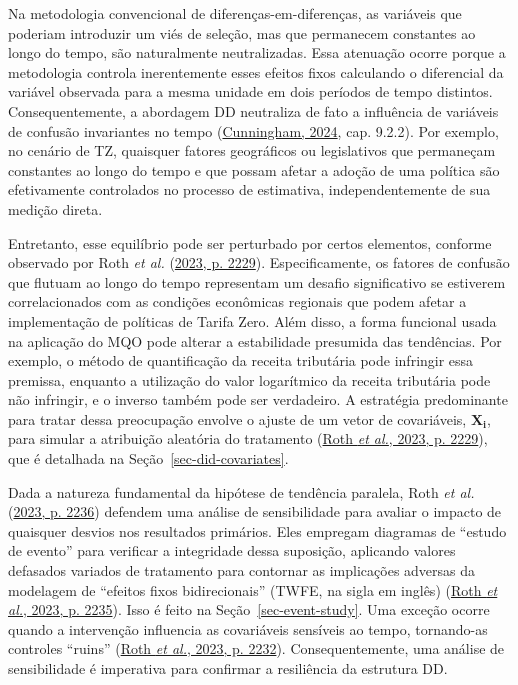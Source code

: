 \documentclass[12pt, a4paper, twoside]{article}
\numberwithin{equation}{subsection} %
\begin{document}
Na metodologia convencional de diferenças-em-diferenças, as variáveis
que poderiam introduzir um viés de seleção, mas que permanecem
constantes ao longo do tempo, são naturalmente neutralizadas. Essa
atenuação ocorre porque a metodologia controla inerentemente esses
efeitos fixos calculando o diferencial da variável observada para a
mesma unidade em dois períodos de tempo distintos. Consequentemente, a
abordagem DD neutraliza de fato a influência de variáveis de confusão
invariantes no tempo
(\protect\hyperlink{ref-cunningham_causal_2024}{Cunningham, 2024}, cap.
9.2.2). Por exemplo, no cenário de TZ, quaisquer fatores geográficos ou
legislativos que permaneçam constantes ao longo do tempo e que possam
afetar a adoção de uma política são efetivamente controlados no processo
de estimativa, independentemente de sua medição direta.

Entretanto, esse equilíbrio pode ser perturbado por certos elementos,
conforme observado por Roth \emph{et al.}
(\protect\hyperlink{ref-roth_whats_2023}{2023, p. 2229}).
Especificamente, os fatores de confusão que flutuam ao longo do tempo
representam um desafio significativo se estiverem correlacionados com as
condições econômicas regionais que podem afetar a implementação de
políticas de Tarifa Zero. Além disso, a forma funcional usada na
aplicação do MQO pode alterar a estabilidade presumida das tendências.
Por exemplo, o método de quantificação da receita tributária pode
infringir essa premissa, enquanto a utilização do valor logarítmico da
receita tributária pode não infringir, e o inverso também pode ser
verdadeiro. A estratégia predominante para tratar dessa preocupação
envolve o ajuste de um vetor de covariáveis, \(\boldsymbol{X_i}\), para
simular a atribuição aleatória do tratamento
(\protect\hyperlink{ref-roth_whats_2023}{Roth \emph{et al.}, 2023, p.
2229}), que é detalhada na Seção~\ref{sec-did-covariates}.

Dada a natureza fundamental da hipótese de tendência paralela, Roth
\emph{et al.} (\protect\hyperlink{ref-roth_whats_2023}{2023, p. 2236})
defendem uma análise de sensibilidade para avaliar o impacto de
quaisquer desvios nos resultados primários. Eles empregam diagramas de
``estudo de evento'' para verificar a integridade dessa suposição,
aplicando valores defasados variados de tratamento para contornar as
implicações adversas da modelagem de ``efeitos fixos bidirecionais''
(TWFE, na sigla em inglês) (\protect\hyperlink{ref-roth_whats_2023}{Roth
\emph{et al.}, 2023, p. 2235}). Isso é feito na
Seção~\ref{sec-event-study}. Uma exceção ocorre quando a intervenção
influencia as covariáveis sensíveis ao tempo, tornando-as controles
``ruins'' (\protect\hyperlink{ref-roth_whats_2023}{Roth \emph{et al.},
2023, p. 2232}). Consequentemente, uma análise de sensibilidade é
imperativa para confirmar a resiliência da estrutura DD.
\end{document}
